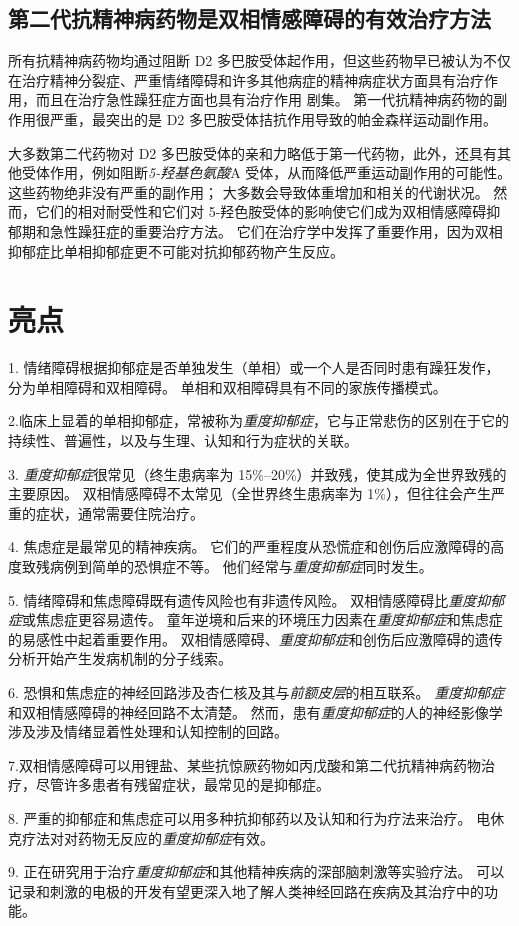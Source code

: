 \subsection{第二代抗精神病药物是双相情感障碍的有效治疗方法}

所有抗精神病药物均通过阻断 D2 多巴胺受体起作用，但这些药物早已被认为不仅在治疗精神分裂症、严重情绪障碍和许多其他病症的精神病症状方面具有治疗作用，而且在治疗急性躁狂症方面也具有治疗作用 剧集。
第一代抗精神病药物的副作用很严重，最突出的是 D2 多巴胺受体拮抗作用导致的帕金森样运动副作用。


大多数第二代药物对 D2 多巴胺受体的亲和力略低于第一代药物，此外，还具有其他受体作用，例如阻断\textit{5-羟基色氨酸}A 受体，从而降低严重运动副作用的可能性。
这些药物绝非没有严重的副作用；
大多数会导致体重增加和相关的代谢状况。
然而，它们的相对耐受性和它们对 5-羟色胺受体的影响使它们成为双相情感障碍抑郁期和急性躁狂症的重要治疗方法。
它们在治疗学中发挥了重要作用，因为双相抑郁症比单相抑郁症更不可能对抗抑郁药物产生反应。



\section{亮点}

1. 情绪障碍根据抑郁症是否单独发生（单相）或一个人是否同时患有躁狂发作，分为单相障碍和双相障碍。
单相和双相障碍具有不同的家族传播模式。 


2.临床上显着的单相抑郁症，常被称为\textit{重度抑郁症}，它与正常悲伤的区别在于它的持续性、普遍性，以及与生理、认知和行为症状的关联。


3. \textit{重度抑郁症}很常见（终生患病率为 15\%–20\%）并致残，使其成为全世界致残的主要原因。
双相情感障碍不太常见（全世界终生患病率为 1\%），但往往会产生严重的症状，通常需要住院治疗。 


4. 焦虑症是最常见的精神疾病。
它们的严重程度从恐慌症和创伤后应激障碍的高度致残病例到简单的恐惧症不等。
他们经常与\textit{重度抑郁症}同时发生。


5. 情绪障碍和焦虑障碍既有遗传风险也有非遗传风险。
双相情感障碍比\textit{重度抑郁症}或焦虑症更容易遗传。
童年逆境和后来的环境压力因素在\textit{重度抑郁症}和焦虑症的易感性中起着重要作用。
双相情感障碍、\textit{重度抑郁症}和创伤后应激障碍的遗传分析开始产生发病机制的分子线索。


6. 恐惧和焦虑症的神经回路涉及杏仁核及其与\textit{前额皮层}的相互联系。
\textit{重度抑郁症}和双相情感障碍的神经回路不太清楚。
然而，患有\textit{重度抑郁症}的人的神经影像学涉及涉及情绪显着性处理和认知控制的回路。


7.双相情感障碍可以用锂盐、某些抗惊厥药物如丙戊酸和第二代抗精神病药物治疗，尽管许多患者有残留症状，最常见的是抑郁症。


8. 严重的抑郁症和焦虑症可以用多种抗抑郁药以及认知和行为疗法来治疗。
电休克疗法对对药物无反应的\textit{重度抑郁症}有效。


9. 正在研究用于治疗\textit{重度抑郁症}和其他精神疾病的深部脑刺激等实验疗法。
可以记录和刺激的电极的开发有望更深入地了解人类神经回路在疾病及其治疗中的功能。




